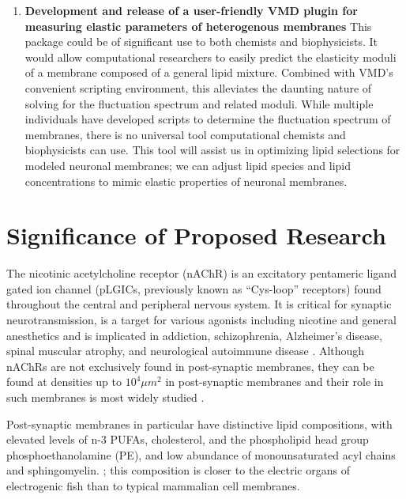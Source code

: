 \documentclass{article}
\begin{document}
\begin{enumerate}
  \item \textbf{Development and release of a user-friendly VMD plugin for measuring elastic parameters of heterogenous membranes} This package could be of significant use to both chemists and biophysicists. It would allow computational researchers to easily predict the elasticity moduli of a membrane composed of a general lipid mixture. Combined with VMD’s convenient scripting environment, this alleviates the daunting nature of solving for the fluctuation spectrum and related moduli. While multiple individuals have developed scripts to determine the fluctuation spectrum of membranes, there is no universal tool computational chemists and biophysicists can use. This tool will assist us in optimizing lipid selections for modeled neuronal membranes; we can adjust lipid species and lipid concentrations to mimic elastic properties of neuronal membranes. 
\end{enumerate}

\newpage

\section{Significance of Proposed Research}
The nicotinic acetylcholine receptor (nAChR) is an excitatory pentameric ligand gated ion channel (pLGICs, previously known as “Cys-loop” receptors) found throughout the central and peripheral nervous system. It is critical for synaptic neurotransmission, is a target for various agonists including nicotine and general anesthetics \cite{Bondarenko_NMR_2013,Jayakar_Identification_2013,Ryan_Structural_1996,Mantipragada_Lipid_2003} and is implicated in addiction, schizophrenia, Alzheimer’s disease, spinal muscular atrophy, and neurological autoimmune disease \cite{MartinRuiz_4_1999, Arnold_Reduced_2004,Lennon_Immunization_2003,Papke_The_2012,Picciotto_Neuroprotection_2008}.  Although nAChRs are not exclusively found in post-synaptic membranes, they can be found at densities up to $10^4$$\mu m^2$ in post-synaptic membranes and their role in such membranes is most widely studied \cite{Bermdez_Partition_2010,Zuber_Structure_2013}.

Post-synaptic membranes in particular have distinctive lipid compositions, with elevated levels of n-3 PUFAs, cholesterol, and the phospholipid head group phosphoethanolamine (PE), and low abundance of monounsaturated acyl chains and sphingomyelin. \cite{Breckenridge_Adult_1973,Cotman_Lipid_1969}; this composition is closer to the electric organs of electrogenic fish \cite{Bara89,Quesada_Uncovering_2016} than to typical mammalian cell membranes.
\end{document}
